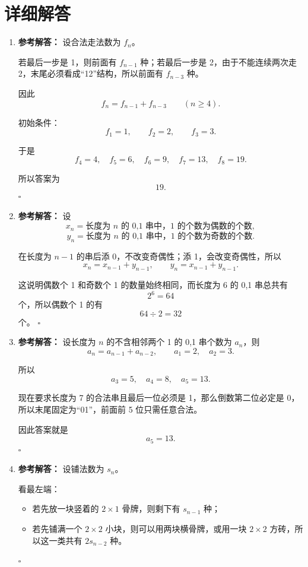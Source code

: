 \documentclass[11pt,a4paper,fontset=fandol]{ctexart}
\newenvironment{solution}{\par\noindent\textbf{参考解答：}}{\hfill$\square$\par}
\begin{document}
\newpage
\section{详细解答}

\begin{enumerate}
  \item \begin{solution}
  设合法走法数为 $f_n$。

  若最后一步是 1，则前面有 $f_{n-1}$ 种；若最后一步是 2，由于不能连续两次走 2，末尾必须看成“12”结构，所以前面有 $f_{n-3}$ 种。

  因此
  \[
  f_n=f_{n-1}+f_{n-3} \qquad (n\ge 4).
  \]

  初始条件：
  \[
  f_1=1,\qquad f_2=2,\qquad f_3=3.
  \]

  于是
  \[
  f_4=4,\quad f_5=6,\quad f_6=9,\quad f_7=13,\quad f_8=19.
  \]

  所以答案为
  \[
  19.
  \]
  \end{solution}

  \item \begin{solution}
  设
  \[
  x_n=\text{长度为 $n$ 的 0,1 串中，1 的个数为偶数的个数},
  \]
  \[
  y_n=\text{长度为 $n$ 的 0,1 串中，1 的个数为奇数的个数}.
  \]

  在长度为 $n-1$ 的串后添 0，不改变奇偶性；添 1，会改变奇偶性，所以
  \[
  x_n=x_{n-1}+y_{n-1},
  \qquad
  y_n=x_{n-1}+y_{n-1}.
  \]

  这说明偶数个 1 和奇数个 1 的数量始终相同，而长度为 6 的 0,1 串总共有
  \[
  2^6=64
  \]
  个，所以偶数个 1 的有
  \[
  64\div 2=32
  \]
  个。
  \end{solution}

  \item \begin{solution}
  设长度为 $n$ 的不含相邻两个 1 的 0,1 串个数为 $a_n$，则
  \[
  a_n=a_{n-1}+a_{n-2},
  \qquad
  a_1=2,
  \quad
  a_2=3.
  \]

  所以
  \[
  a_3=5,\quad a_4=8,\quad a_5=13.
  \]

  现在要求长度为 7 的合法串且最后一位必须是 1，那么倒数第二位必定是 0，所以末尾固定为“01”，前面前 5 位只需任意合法。

  因此答案就是
  \[
  a_5=13.
  \]
  \end{solution}

  \item \begin{solution}
  设铺法数为 $s_n$。

  看最左端：
  \begin{itemize}
    \item 若先放一块竖着的 $2\times 1$ 骨牌，则剩下有 $s_{n-1}$ 种；
    \item 若先铺满一个 $2\times 2$ 小块，则可以用两块横骨牌，或用一块 $2\times 2$ 方砖，所以这一类共有 $2s_{n-2}$ 种。
  \end{itemize}


\end{solution}
\end{enumerate}
\end{document}
